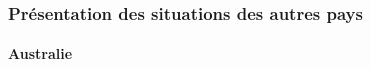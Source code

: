 \documentclass{article}
\begin{document}
\subsubsection{Présentation des situations des autres pays}

\paragraph{Australie}

\end{document}
